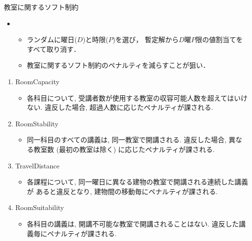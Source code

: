 \documentclass[11pt,dvipdfmx]{beamer}
\begin{document}
\begin{frame}{教室に関するソフト制約}
 \begin{block}{}
 \begin{itemize}
  \item {}
   \begin{itemize}
    \item ランダムに曜日($D$)と時限($P$)を選び，
    暫定解から$D$曜$P$限の値割当てをすべて取り消す．
    \item 教室に関するソフト制約のペナルティを減らすことが狙い．
   \end{itemize}
  \end{itemize}
 \end{block}
 \begin{enumerate}
  \item \alert{RoomCapacity}
   \begin{itemize}
    \item 各科目について, 受講者数が使用する教室の収容可能人数を超えてはいけない. 
    違反した場合, 超過人数に応じたペナルティが課される. 
   \end{itemize}
  \item RoomStability
   \begin{itemize}
    \item 同一科目のすべての講義は, 同一教室で開講される. 
    違反した場合, 異なる教室数 (最初の教室は除く) に応じたペナルティが課される.
   \end{itemize}
  \item \alert{TravelDistance}
   \begin{itemize}
    \item 各課程について, 同一曜日に異なる建物の教室で開講される連続した講義が
    あると違反となり, 建物間の移動毎にペナルティが課される.
   \end{itemize}
  \item RoomSuitability
   \begin{itemize}
    \item 各科目の講義は, 開講不可能な教室で開講されることはない. 
    違反した講義毎にペナルティが課される. 
   \end{itemize}
 \end{enumerate}
\end{frame}
\end{document}
